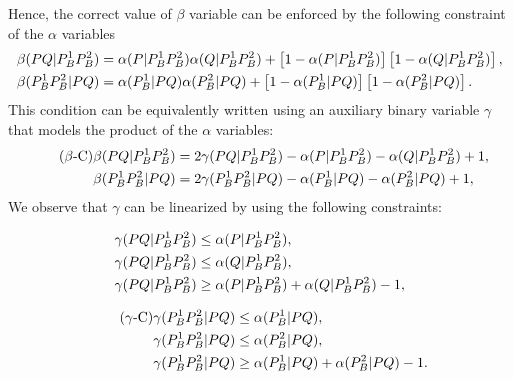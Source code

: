 \documentclass[a4paper,  review, authoryear, 1p.]{elsarticle}
\begin{document}
		Hence, the correct value of $\beta$ variable can be enforced by the following constraint of the $\alpha$ variables
		\begin{align*}%
			\betamas{P}{Q}{P_B^1}{P_B^2}&=\alphamas{P}{P_B^1}{P_B^2}\alphamas{Q}{P_B^1}{P_B^2} + \left[1-\alphamas{P}{P_B^1}{P_B^2}\right]\left[1-\alphamas{Q}{P_B^1}{P_B^2}\right],\\
			\betamas{P_B^1}{P_B^2}{P}{Q}&=\alphamas{P_B^1}{P}{Q}\alphamas{P_B^2}{P}{Q} + \left[1-\alphamas{P_B^1}{P}{Q}\right]\left[1-\alphamas{P_B^2}{P}{Q}\right].
		\end{align*}
		This condition can be equivalently written using an auxiliary binary variable $\gamma$ that models the product of the $\alpha$ variables:
		\begin{align*}\tag{$\beta$-C}\label{eq:betaC}
			\beta(PQ|P_B^1P_B^2)&=2\gamma(PQ|P_B^1P_B^2) -\alpha(P|P_B^1P_B^2)-\alpha(Q|P_B^1P_B^2)+1,\\
			\beta(P_B^1P_B^2|PQ)&=2\gamma(P_B^1P_B^2|PQ) -\alpha(P_B^1|PQ)-\alpha(P_B^2|PQ)+1,
		\end{align*}
		We observe that $\gamma$ can be linearized by using the following constraints:
		
		\begin{minipage}{.5\linewidth}
			\begin{align*}
				\gamma(PQ|P_B^1P_B^2) & \leq \alpha(P|P_B^1P_B^2),\\
				\gamma(PQ|P_B^1P_B^2) & \leq \alpha(Q|P_B^1P_B^2),\\
				\gamma(PQ|P_B^1P_B^2) & \geq \alpha(P|P_B^1P_B^2) + \alpha(Q|P_B^1P_B^2) - 1,
			\end{align*}
		\end{minipage}
		\begin{minipage}{.5\linewidth}
			\begin{align*}\tag{$\gamma$-C}\label{eq:gammaC}
				\gamma(P_B^1P_B^2|PQ) & \leq \alpha(P_B^1|PQ),\\
				\gamma(P_B^1P_B^2|PQ) & \leq \alpha(P_B^2|PQ),\\
				\gamma(P_B^1P_B^2|PQ) & \geq \alpha(P_B^1|PQ) + \alpha(P_B^2|PQ) - 1.
			\end{align*}
		\end{minipage}
		
		\bigskip
		
		\newcommand{\deltacheck}[4]{\delta(#1#2|#3#4)}
		
\end{document}

